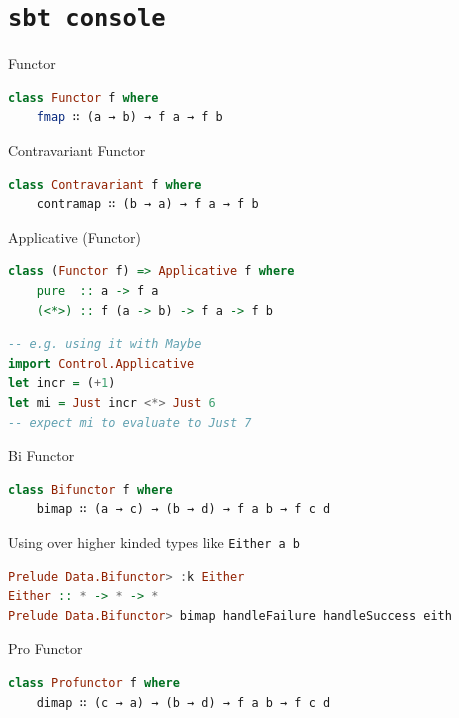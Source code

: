 \documentclass[compress]{beamer}
\begin{document}
\section{\tt{sbt console}}

\begin{frame}[containsverbatim]{Functor}
\begin{lstlisting}[language=haskell]
class Functor f where
    fmap ∷ (a → b) → f a → f b
\end{lstlisting}
\end{frame}

\begin{frame}[containsverbatim]{Contravariant Functor}
\begin{lstlisting}[language=haskell]
class Contravariant f where
    contramap ∷ (b → a) → f a → f b
\end{lstlisting}
\end{frame}

\begin{frame}[containsverbatim]{Applicative (Functor)}
\begin{lstlisting}[language=haskell]
class (Functor f) => Applicative f where
    pure  :: a -> f a
    (<*>) :: f (a -> b) -> f a -> f b
\end{lstlisting}

\begin{lstlisting}[language=haskell]
-- e.g. using it with Maybe
import Control.Applicative
let incr = (+1)
let mi = Just incr <*> Just 6
-- expect mi to evaluate to Just 7
\end{lstlisting}
\end{frame}

\begin{frame}[containsverbatim]{Bi Functor}
\begin{lstlisting}[language=haskell]
class Bifunctor f where
    bimap ∷ (a → c) → (b → d) → f a b → f c d
\end{lstlisting}
\small{Using over higher kinded types like \tt{Either a b}}
\begin{lstlisting}[language=haskell]
Prelude Data.Bifunctor> :k Either
Either :: * -> * -> *
Prelude Data.Bifunctor> bimap handleFailure handleSuccess eith
\end{lstlisting}
\end{frame}

\begin{frame}[containsverbatim]{Pro Functor}
\begin{lstlisting}[language=haskell]
class Profunctor f where
    dimap ∷ (c → a) → (b → d) → f a b → f c d
\end{lstlisting}
\end{frame}
\end{document}
